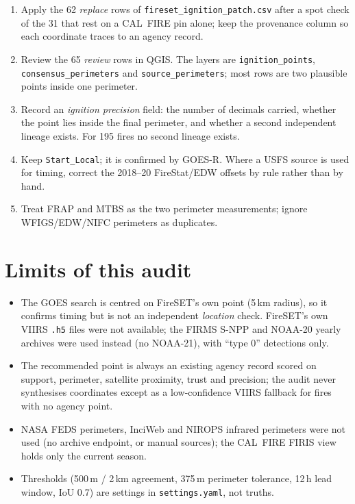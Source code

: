 \documentclass[11pt,a4paper]{article}
\begin{document}
\begin{enumerate}[leftmargin=*, itemsep=3pt]
\item Apply the 62 \emph{replace} rows of \texttt{fireset\_ignition\_patch.csv} after a spot check of the 31 that
rest on a CAL~FIRE pin alone; keep the provenance column so each coordinate traces to an agency record.
\item Review the 65 \emph{review} rows in QGIS. The layers are \texttt{ignition\_points},
\texttt{consensus\_perimeters} and \texttt{source\_perimeters}; most rows are two plausible points inside one
perimeter.
\item Record an \emph{ignition precision} field: the number of decimals carried, whether the point lies inside the
final perimeter, and whether a second independent lineage exists. For 195 fires no second lineage exists.
\item Keep \texttt{Start\_Local}; it is confirmed by GOES-R. Where a USFS source is used for timing, correct the
2018--20 FireStat/EDW offsets by rule rather than by hand.
\item Treat FRAP and MTBS as the two perimeter measurements; ignore WFIGS/EDW/NIFC perimeters as duplicates.
\end{enumerate}

\section{Limits of this audit}

\begin{itemize}[leftmargin=*, itemsep=2pt]
\item The GOES search is centred on FireSET's own point (5\,km radius), so it confirms timing but is not an
independent \emph{location} check. FireSET's own VIIRS \texttt{.h5} files were not available; the FIRMS S-NPP and
NOAA-20 yearly archives were used instead (no NOAA-21), with ``type 0'' detections only.
\item The recommended point is always an existing agency record scored on support, perimeter, satellite
proximity, trust and precision; the audit never synthesises coordinates except as a low-confidence VIIRS
fallback for fires with no agency point.
\item NASA FEDS perimeters, InciWeb and NIROPS infrared perimeters were not used (no archive endpoint, or manual
sources); the CAL~FIRE FIRIS view holds only the current season.
\item Thresholds (500\,m / 2\,km agreement, 375\,m perimeter tolerance, 12\,h lead window, IoU 0.7) are settings
in \texttt{settings.yaml}, not truths.
\end{itemize}
\end{document}
